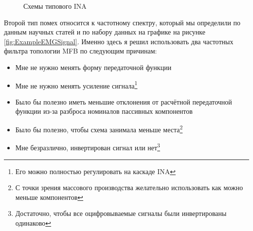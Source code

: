 \documentclass[a4paper, 10pt, final]{article} %
\begin{document}
\begin{figure}[H]
\begin{minipage}[H]{.64\linewidth}
            \label{fig:INAInternalSchematic}
        \end{minipage}
        \hspace{.04\linewidth}
        \caption{Схемы типового INA}
        \label{fig:INASchematic}
    \end{figure}

    Второй тип помех относится к частотному спектру, который мы определили по данным научных статей и по набору данных на графике на рисунке \ref{fig:ExampleEMGSignal}.
    Именно здесь я решил использовать два частотных фильтра топологии MFB по следующим причинам:
    \begin{itemize}
        \item Мне не нужно менять форму передаточной функции
        \item Мне не нужно менять усиление сигнала\footnote{Его можно полностью регулировать на каскаде INA}
        \item Было бы полезно иметь меньшие отклонения от расчётной передаточной функции из-за разброса номиналов пассивных компонентов
        \item Было бы полезно, чтобы схема занимала меньше места\footnote{С точки зрения массового производства желательно использовать как можно меньше компонентов}
        \item Мне безразлично, инвертирован сигнал или нет\footnote{Достаточно, чтобы все оцифровываемые сигналы были инвертированы одинаково}
    \end{itemize}
    
\end{document}
